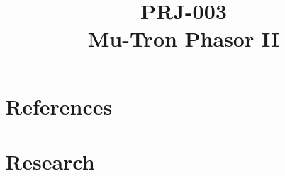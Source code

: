 \documentclass[11pt,a4paper]{article}
\title{\textbf{PRJ-003\\ Mu-Tron Phasor II}}
\begin{document}
\maketitle
\tableofcontents
\newpage

\section{}

\section{References}

\section{Research}


\end{document}
